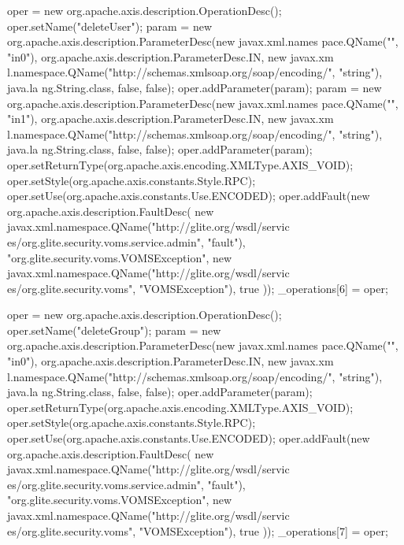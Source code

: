 \begin{DoxyCode}
{        oper = new org.apache.axis.description.OperationDesc();
        oper.setName("deleteUser");
        param = new org.apache.axis.description.ParameterDesc(new javax.xml.names
      pace.QName("", "in0"), org.apache.axis.description.ParameterDesc.IN, new javax.xm
      l.namespace.QName("http://schemas.xmlsoap.org/soap/encoding/", "string"), java.la
      ng.String.class, false, false);
        oper.addParameter(param);
        param = new org.apache.axis.description.ParameterDesc(new javax.xml.names
      pace.QName("", "in1"), org.apache.axis.description.ParameterDesc.IN, new javax.xm
      l.namespace.QName("http://schemas.xmlsoap.org/soap/encoding/", "string"), java.la
      ng.String.class, false, false);
        oper.addParameter(param);
        oper.setReturnType(org.apache.axis.encoding.XMLType.AXIS_VOID);
        oper.setStyle(org.apache.axis.constants.Style.RPC);
        oper.setUse(org.apache.axis.constants.Use.ENCODED);
        oper.addFault(new org.apache.axis.description.FaultDesc(
                      new javax.xml.namespace.QName("http://glite.org/wsdl/servic
      es/org.glite.security.voms.service.admin", "fault"),
                      "org.glite.security.voms.VOMSException",
                      new javax.xml.namespace.QName("http://glite.org/wsdl/servic
      es/org.glite.security.voms", "VOMSException"), 
                      true
                     ));
        _operations[6] = oper;

        oper = new org.apache.axis.description.OperationDesc();
        oper.setName("deleteGroup");
        param = new org.apache.axis.description.ParameterDesc(new javax.xml.names
      pace.QName("", "in0"), org.apache.axis.description.ParameterDesc.IN, new javax.xm
      l.namespace.QName("http://schemas.xmlsoap.org/soap/encoding/", "string"), java.la
      ng.String.class, false, false);
        oper.addParameter(param);
        oper.setReturnType(org.apache.axis.encoding.XMLType.AXIS_VOID);
        oper.setStyle(org.apache.axis.constants.Style.RPC);
        oper.setUse(org.apache.axis.constants.Use.ENCODED);
        oper.addFault(new org.apache.axis.description.FaultDesc(
                      new javax.xml.namespace.QName("http://glite.org/wsdl/servic
      es/org.glite.security.voms.service.admin", "fault"),
                      "org.glite.security.voms.VOMSException",
                      new javax.xml.namespace.QName("http://glite.org/wsdl/servic
      es/org.glite.security.voms", "VOMSException"), 
                      true
                     ));
        _operations[7] = oper;

}
\end{DoxyCode}
